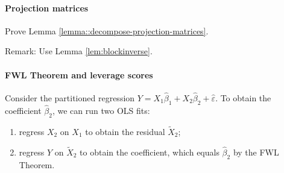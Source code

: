 %

 
 
 
 
\paragraph{Projection matrices}\label{hw08::decompose-projection-m}

 Prove Lemma \ref{lemma::decompose-projection-matrices}. 
 
 
 Remark: Use Lemma \ref{lem:blockinverse}. 



\paragraph{FWL Theorem and leverage scores}\label{hw7::fwl-hat-matrix}

Consider the partitioned regression $Y = X_1 \hat{\beta}_1 + X_2 \hat{\beta}_2 + \hat{\varepsilon}$.
To obtain the coefficient $\hat{\beta}_2$, we can run two OLS fits: 
\begin{enumerate}[label=(R\arabic*), ref=R\arabic*]
\item\label{reg1-leverage}
regress $X_2$ on $X_1$ to obtain the residual $\tilde{X}_2$;
\item\label{reg2-leverage}
regress $Y$ on $\tilde{X}_2$ to obtain the coefficient, which equals $\hat{\beta}_2$ by the FWL Theorem. 
\end{enumerate}

